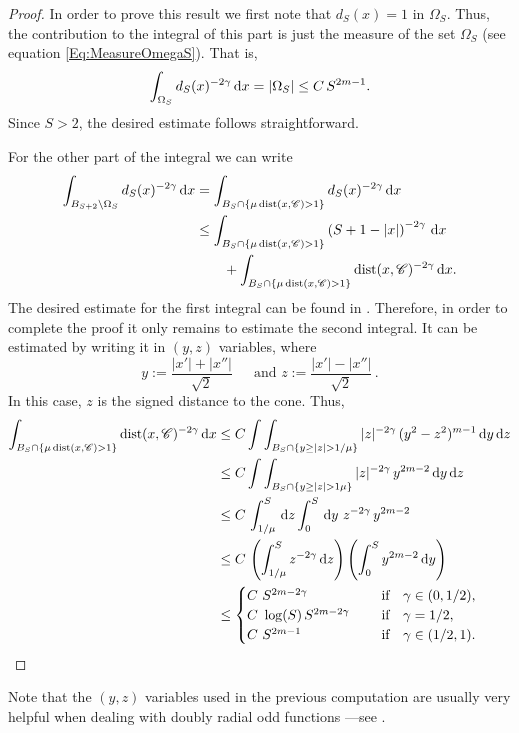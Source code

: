 \begin{proof}
In order to prove this result we first note that $d_S(x)=1$ in $\Omega_S$. Thus, the contribution to the integral of this part is just the measure of the set $\Omega_S$ (see equation \eqref{Eq:MeasureOmegaS}). That is,
$$
\int_{\Omega_S} d_S(x)^{-2\gamma} \,\mathrm{d} x = |\Omega_S| \leq C\,S^{2m-1}.
$$
Since $S>2$, the desired estimate follows straightforward.

For the other part of the integral we can write
\begin{align*}
\int_{B_{S+2}\setminus \Omega_S} d_S(x)^{-2\gamma} \,\mathrm{d} x &= \int_{B_{S}\cap \{\mu \operatorname{dist}(x,\mathscr{C})>1\}} d_S(x)^{-2\gamma} \,\mathrm{d} x \\
& \leq \int_{B_{S}\cap \{\mu \operatorname{dist}(x,\mathscr{C})>1\}} \left( S+1-|x| \right)^{-2\gamma} \,\mathrm{d} x \\
& \quad \quad + \int_{B_{S}\cap \{\mu \operatorname{dist}(x,\mathscr{C})>1\}} \operatorname{dist}(x,\mathscr{C})^{-2\gamma} \,\mathrm{d} x.
\end{align*}
The desired estimate for the first integral can be found in \cite{SavinValdinoci-EnergyEstimate}. Therefore, in order to complete the proof it only remains to estimate the second integral. It can be estimated by writing it in $(y,z)$ variables, where
$$
y := \dfrac{|x'|+|x''|}{\sqrt{2}} \, \quad \text{ and } z := \dfrac{|x'|-|x''|}{\sqrt{2}}\,.
$$
In this case, $z$ is the signed distance to the cone. Thus,
\begin{align*}
\int_{B_{S}\cap \{\mu \dist(x,\ccal)>1\}} \dist(x,\ccal)^{-2\s} \d x &\leq C \int \int_{B_{S}\cap \{y\geq|z|>1/\mu\}} |z|^{-2\s} \, (y^2-z^2)^{m-1} \d y\d z \\
& \leq C \int \int_{B_{S}\cap \{y\geq|z|>1\mu\}} |z|^{-2\s} \, y^{2m-2} \d y\d z \\
& \leq C\, \int_{1/\mu}^S \d z \int_0^S \d y\ z^{-2\s} \, y^{2m-2} \\
& \leq C\, \left(\int_{1/\mu}^S z^{-2\s} \d z \right)  \left(  \int_0^S  y^{2m-2} \d y \right) \\
& \leq \begin{cases}
C \ S^{2m-2\s}\ \ \ \ &\textrm{if } \ \ \s\in(0,1/2),\\
C\ \log(S)\,S^{2m-2\s}\ \ \ \ &\textrm{if } \ \ \s=1/2,\\
C \ S^{2m-1}\ \ \ \ &\textrm{if } \ \ \s\in(1/2,1).\\
\end{cases}
\end{align*}
\end{proof}

Note that the $(y,z)$ variables used in the previous computation are usually very helpful when dealing with doubly radial odd functions ---see \cite{CabreTerraI, CabreTerraII, Cabre-Saddle, Cinti-Saddle,Cinti-Saddle2, Felipe-Sanz-Perela:SaddleFractional}.

